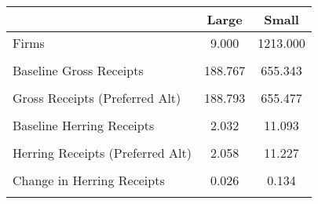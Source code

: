 \begin{tabular}{l*{2}{c}}
\hline\hline
                &    Large&    Small\\
\hline
Firms           &    9.000& 1213.000\\
                &         &         \\
Baseline Gross Receipts&  188.767&  655.343\\
                &         &         \\
Gross Receipts (Preferred Alt)&  188.793&  655.477\\
                &         &         \\
Baseline Herring Receipts&    2.032&   11.093\\
                &         &         \\
Herring Receipts  (Preferred Alt)&    2.058&   11.227\\
                &         &         \\
Change in Herring Receipts&    0.026&    0.134\\
                &         &         \\
\hline\hline
\end{tabular}
